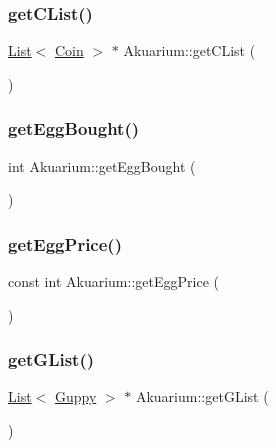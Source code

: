 \subsubsection{\texorpdfstring{get\+C\+List()}{getCList()}}
{\footnotesize\ttfamily \mbox{\hyperlink{class_list}{List}}$<$ \mbox{\hyperlink{class_coin}{Coin}} $>$ $\ast$ Akuarium\+::get\+C\+List (\begin{DoxyParamCaption}{ }\end{DoxyParamCaption})}

\mbox{\label{class_akuarium_ad5c60aa9ac76b1af2de9ed50765ef9cf}} 
\subsubsection{\texorpdfstring{get\+Egg\+Bought()}{getEggBought()}}
{\footnotesize\ttfamily int Akuarium\+::get\+Egg\+Bought (\begin{DoxyParamCaption}{ }\end{DoxyParamCaption})}

\mbox{\label{class_akuarium_a45b387e510e5a938017908a63d22283c}} 
\subsubsection{\texorpdfstring{get\+Egg\+Price()}{getEggPrice()}}
{\footnotesize\ttfamily const int Akuarium\+::get\+Egg\+Price (\begin{DoxyParamCaption}{ }\end{DoxyParamCaption})}

\mbox{\label{class_akuarium_aea95fa5feed9d17dd8cee6a716413222}} 
\subsubsection{\texorpdfstring{get\+G\+List()}{getGList()}}
{\footnotesize\ttfamily \mbox{\hyperlink{class_list}{List}}$<$ \mbox{\hyperlink{class_guppy}{Guppy}} $>$ $\ast$ Akuarium\+::get\+G\+List (\begin{DoxyParamCaption}{ }\end{DoxyParamCaption})}

